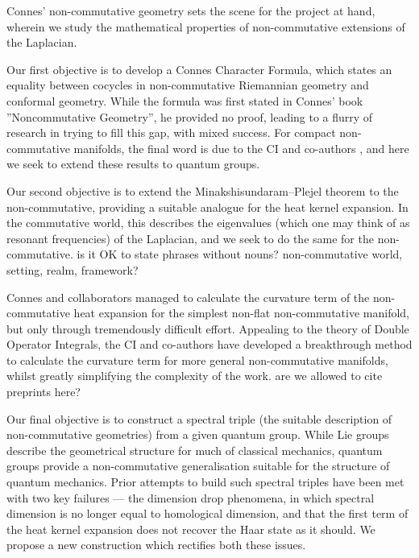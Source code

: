\documentclass[12pt]{article}
\begin{document}
Connes' non-commutative geometry sets the scene for the project at hand, wherein we study the mathematical properties of non-commutative extensions of the Laplacian.

Our first objective is to develop a Connes Character Formula, which states
an equality between cocycles in non-commutative Riemannian geometry and
conformal geometry. While the formula was first stated in Connes' book ''Noncommutative Geometry'', he provided no proof, leading to a flurry of research in trying to fill this gap, with mixed success. For compact non-commutative manifolds, the final word is due to the CI and co-authors \cite{CRSZ}, and here we seek to extend these results to quantum
groups.


Our second objective is to extend the Minakshisundaram--Plejel theorem to the
non-commutative, providing a suitable analogue for the heat kernel expansion. In the commutative world, this describes the eigenvalues (which one may think of as resonant frequencies) of the Laplacian, and we seek to do the same for the non-commutative. {\color{blue} is it OK to state phrases without nouns? non-commutative world, setting, realm, framework?}

Connes and collaborators managed to calculate the curvature term of the non-commutative heat expansion for the simplest non-flat non-commutative manifold, but only through tremendously difficult effort. Appealing to the theory of Double Operator Integrals, the CI and co-authors have developed a breakthrough method to calculate the curvature term for more general non-commutative manifolds, whilst greatly simplifying the complexity of the work. {\color{blue} are we allowed to cite preprints here?}

Our final objective is to construct a spectral triple (the suitable description of non-commutative geometries) from a given quantum group. While Lie groups describe the geometrical structure for much of classical mechanics, quantum groups provide a non-commutative generalisation suitable for the structure of quantum mechanics.
Prior attempts to build such spectral triples have been met with two key failures
--- the dimension drop phenomena, in which spectral dimension is no longer equal
to homological dimension, and that the first term of the heat kernel expansion does not recover the Haar state as it should. We propose a new construction which rectifies both these issues.
\end{document}
